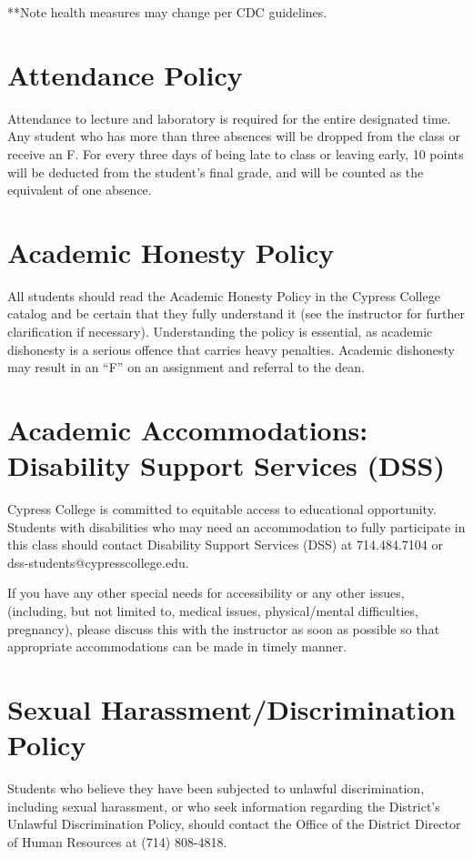 \documentclass[11pt]{article}
\begin{document}
**Note health measures may change per CDC guidelines.

\section{Attendance Policy}

Attendance to lecture and laboratory is required for the entire designated time.
Any student who has more than three absences will be dropped from the class or
receive an F. For every three days of being late to class or leaving early, 10
points will be deducted from the student’s final grade, and will be counted as
the equivalent of one absence.


\section{Academic Honesty Policy}

All students should read the Academic Honesty Policy in the Cypress College catalog
and be certain that they fully understand it (see the instructor for further clarification
if necessary). Understanding the policy is essential, as academic dishonesty is a
serious offence that carries heavy penalties. Academic dishonesty may result in an
“F” on an assignment and referral to the dean.

\section{Academic Accommodations: Disability Support Services (DSS)}

Cypress College is committed to equitable access to educational opportunity.
Students with disabilities who may need an accommodation to fully participate in
this class should contact Disability Support Services (DSS) at 714.484.7104 or
dss-students@cypresscollege.edu.

If you have any other special needs for accessibility or any other issues,
(including, but not limited to, medical issues, physical/mental difficulties,
pregnancy), please discuss this with the instructor as soon as possible so that
appropriate accommodations can be made in timely manner. 

\section{Sexual Harassment/Discrimination Policy}

Students who believe they have been subjected to unlawful discrimination,
including sexual harassment, or who seek information regarding the District’s
Unlawful Discrimination Policy, should contact the Office of the District Director
of Human Resources at (714) 808-4818. 
\end{document}
